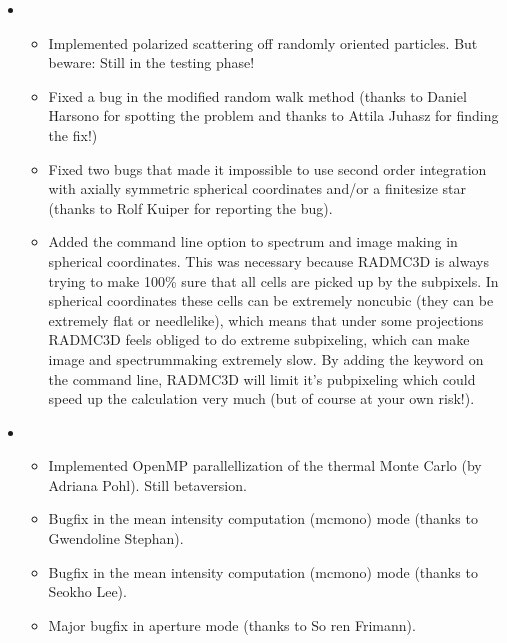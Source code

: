 \documentclass[letterpaper,10pt,english]{sphinxmanual}
\begin{document}
\begin{itemize}
\item {} 
\begin{itemize}
\item {} 
Implemented polarized scattering off randomly oriented
particles. But beware: Still in the testing phase!

\item {} 
Fixed a bug in the modified random walk method (thanks to Daniel
Harsono for spotting the problem and thanks to Attila Juhasz for
finding the fix!)

\item {} 
Fixed two bugs that made it impossible to use second order
integration with axially symmetric spherical coordinates and/or
a finite\sphinxhyphen{}size star (thanks to Rolf Kuiper for reporting the bug).

\item {} 
Added the  command line option to spectrum and
image making in spherical coordinates. This was necessary because
RADMC\sphinxhyphen{}3D is always trying to make 100\% sure that all cells are picked
up by the subpixels. In spherical coordinates these cells can be
extremely non\sphinxhyphen{}cubic (they can be extremely flat or needle\sphinxhyphen{}like), which
means that under some projections RADMC\sphinxhyphen{}3D feels obliged to do extreme
sub\sphinxhyphen{}pixeling, which can make image\sphinxhyphen{} and spectrum\sphinxhyphen{}making extremely slow.
By adding the   keyword on the command line, RADMC\sphinxhyphen{}3D
will limit it’s pubpixeling which could speed up the calculation very
much (but of course at your own risk!).

\end{itemize}

\item {} 
\begin{itemize}
\item {} 
Implemented OpenMP parallellization of the thermal Monte Carlo (by
Adriana Pohl). Still beta\sphinxhyphen{}version.

\item {} 
Bugfix in the mean intensity computation (mcmono) mode (thanks to Gwendoline Stephan).

\item {} 
Bugfix in the mean intensity computation (mcmono) mode (thanks to Seokho Lee).

\item {} 
Major bugfix in aperture mode (thanks to So ren Frimann).


\end{itemize}
\end{itemize}
\end{document}

